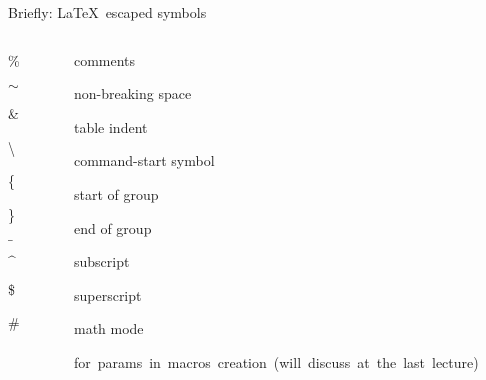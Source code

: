 \begin{frame}{Briefly: \LaTeX\ escaped symbols}\relax
\begin{columns}
\begin{column}{0.1\textwidth}
\begin{center}
\vspace{-1ex}
    \%

    $\sim$ 
    
    \&
    
    \textbackslash 
    
    \{ 
    
    \} 
    
    $\_$ 
    
    $\^$
    
    \$ 
    
    \#
\end{center}
\end{column}
\begin{column}{0.9\textwidth}

\vspace{1ex} \inpause
comments \inpause

non-breaking space \inpause

table indent \inpause

command-start symbol \inpause

start of group \inpause

end of group \inpause

subscript \inpause

superscript \inpause

math mode \inpause

\hbox{for params in macros creation (will discuss at the last lecture)}

\end{column}
     
\end{columns}
\end{frame}

